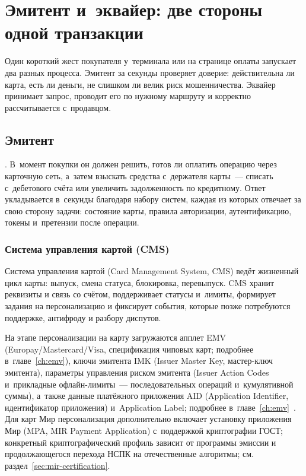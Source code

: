 
\chapter{Эмитент и~эквайер: две стороны одной транзакции}\label{ch:issuer-acquirer}

Один короткий жест покупателя у~терминала или на странице оплаты
запускает два разных процесса. Эмитент за секунды проверяет доверие:
действительна ли карта, есть ли деньги, не слишком ли велик риск
мошенничества. Эквайер принимает запрос, проводит его по нужному
маршруту и корректно рассчитывается с~продавцом.

\section{Эмитент}\label{sec:ia-issuer}

. В~момент покупки он должен решить, готов ли
оплатить операцию через карточную сеть, а~затем взыскать средства
с~держателя карты~--- списать с~дебетового счёта или увеличить
задолженность по кредитному. Ответ укладывается в~секунды
благодаря набору систем, каждая из которых отвечает за свою
сторону задачи: состояние карты, правила авторизации,
аутентификацию, токены и~претензии после операции.

\subsection*{Система управления картой (CMS)}

Система управления картой (Card Management System, CMS) ведёт
жизненный цикл карты: выпуск, смена статуса, блокировка, перевыпуск.
CMS хранит реквизиты и связь со счётом, поддерживает статусы и~лимиты,
формирует задания на персонализацию и фиксирует события, которые
позже потребуются поддержке, антифроду и разбору диспутов.

На этапе персонализации на карту загружаются апплет EMV
(Europay/Mastercard/Visa, спецификация чиповых карт; подробнее
в~главе~\ref{ch:emv}), ключи эмитента IMK (Issuer Master Key,
мастер-ключ эмитента), параметры управления риском эмитента
(Issuer Action Codes и~прикладные офлайн-лимиты~--- последовательных
операций и~кумулятивной суммы), а~также данные платёжного приложения
AID (Application Identifier, идентификатор приложения) и~Application
Label; подробнее в~главе~\ref{ch:emv}~\cite{emvco-book3,emvco-book4}.
Для карт Мир персонализация дополнительно включает установку
приложения Мир (MPA, MIR Payment Application) с~поддержкой криптографии ГОСТ;
конкретный криптографический профиль зависит от программы эмиссии
и продолжающегося перехода НСПК на отечественные алгоритмы;
см. раздел~\ref{sec:mir-certification}.

